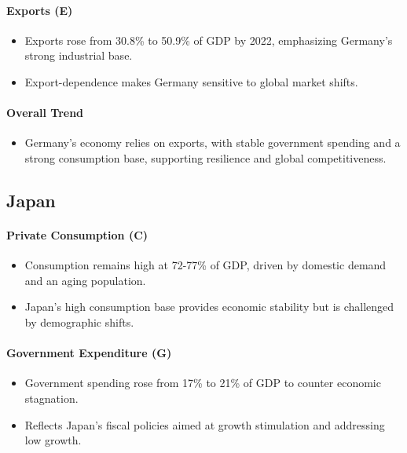 \documentclass[a4paper,12pt]{extarticle} %
\begin{document}
\paragraph{Exports (E)}
\begin{itemize}
    \item Exports rose from 30.8\% to 50.9\% of GDP by 2022, emphasizing Germany’s strong industrial base.
    \item Export-dependence makes Germany sensitive to global market shifts.
\end{itemize}

\paragraph{Overall Trend}
\begin{itemize}
    \item Germany’s economy relies on exports, with stable government spending and a strong consumption base, supporting resilience and global competitiveness.
\end{itemize}

\subsection{Japan}

\paragraph{Private Consumption (C)}
\begin{itemize}
    \item Consumption remains high at 72-77\% of GDP, driven by domestic demand and an aging population.
    \item Japan’s high consumption base provides economic stability but is challenged by demographic shifts.
\end{itemize}

\paragraph{Government Expenditure (G)}
\begin{itemize}
    \item Government spending rose from 17\% to 21\% of GDP to counter economic stagnation.
    \item Reflects Japan’s fiscal policies aimed at growth stimulation and addressing low growth.
\end{itemize}
\end{document}
